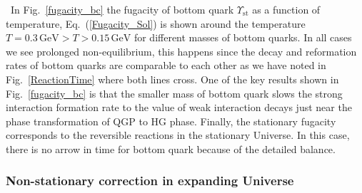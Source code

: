 \,
In Fig.~\ref{fugacity_bc} the fugacity of bottom quark $\Upsilon_{\mathrm{st}}$ as a function of temperature, Eq.~(\ref{Fugacity_Sol}) is shown around the temperature $T=0.3\,\mathrm{GeV}>T>0.15\,\mathrm{GeV}$ for different masses of bottom quarks. In all cases we see prolonged non-equilibrium, this happens since the decay and reformation rates of bottom quarks are comparable to each other as we have noted in Fig.~\ref{ReactionTime} where both lines cross. One of the key results shown in Fig.~\ref{fugacity_bc} is that the smaller mass of bottom quark slows the strong interaction formation rate to the value of weak interaction decays just near the phase transformation of QGP to HG phase. Finally, the stationary fugacity corresponds to the reversible reactions in the stationary Universe. In this case, there is no arrow in time for bottom quark because of the detailed balance.



\subsubsection{Non-stationary correction in expanding Universe}

